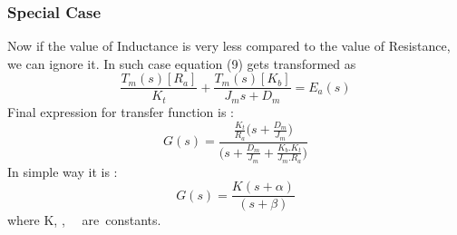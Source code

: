 \documentclass{beamer}
\theoremstyle{remark}
\begin{document}
\begin{frame}
\frametitle{Special Case}
Now if the value of Inductance is very less compared to the value of Resistance, we can ignore it. In such case equation (9) gets transformed as
\begin{equation}
    \frac{T_m(s)[R_a]}{K_t} +  \frac{T_m(s)[K_b]}{J_ms + D_m} = E_a(s)
\end{equation}
Final expression for transfer function is :
\begin{equation}
    G(s) = \frac{\frac{K_t}{R_a}\Big( s + \frac{D_m}{J_m}\Big)}{ \Big(s  + \frac{D_m}{J_m} + \frac{K_b.K_t}{J_m.R_a}\Big)}
\end{equation}
In simple way it is :
\begin{equation}
    G(s) = \frac{K(s + \alpha)}{(s+\beta)}
\end{equation}
where K, \alpha , \ \beta \ are\  constants.
\end{frame}
\end{document}
